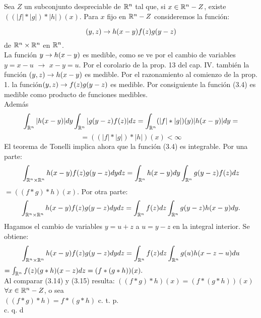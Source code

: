 Sea $Z$ un subconjunto despreciable de $\mathbb{R}^n$ tal que, si $x\in \mathbb{R}^n - Z$, existe $((|f| * |g|)*|h|)(x)$. Para $x$ fijo en $\mathbb{R}^n - Z$ consideremos la función:

\begin{equation}
(y,z) \rightarrow h(x-y)f(z)g(y-z)
\end{equation}
  de $\mathbb{R}^n \times \mathbb{R}^n$ en $\mathbb{R}^n$. \\
  La función $y \rightarrow h(x-y)$ es medible, como se ve por el cambio de variables $y=x-u$ $\to$ $x-y=u$. Por el corolario de la prop. 13 del cap. IV. también la función $(y,z) \rightarrow h(x-y)$ es medible. Por el razonamiento al comienzo de la prop. 1. la función$(y,z) \rightarrow f(z)g(y-z)$ es medible. Por consiguiente la función (3.4) es medible como producto de funciones medibles.\\
Además 
$$
\int_{\mathbb{R}^n}|h(x-y)|dy \int_{\mathbb{R}^n}|g(y-z)f(z)|dz=\int_{
\mathbb{R}^n}  (|f|*|g|)(y)|h(x-y)|dy=
$$
$$
=((|f|*|g|)*|h|)(x) < \infty
$$
El teorema de Tonelli implica ahora que la función (3.4) es integrable. Por una parte:
\begin{equation}
\int_{\mathbb{R}^n \times \mathbb{R}^n} h(x-y)f(z)g(y-z)dydz=\int_{\mathbb{R}^n} h(x-y)dy\int_{\mathbb{R}^n}g(y-z)f(z)dz	
\end{equation}
$=((f*g)*h)(x)$.
Por otra parte:
$$
\int_{\mathbb{R}^n \times \mathbb{R}^n} h(x-y)f(z)g(y-z)dydz=\int_{\mathbb{R}^n} f(z)dz\int_{\mathbb{R}^n}g(y-z)h(x-y)dy.	
$$
Hagamos el cambio de variables $y=u+z$ a $u=y-z$ en la integral interior. Se obtiene: 
\begin{equation}
\int_{\mathbb{R}^n \times \mathbb{R}^n} h(x-y)f(z)g(y-z)dydz=\int_{\mathbb{R}^n} f(z)dz \int_{\mathbb{R}^n}g(u)h(x-z-u)du
\end{equation}
$=\int_{\mathbb{R}^n}f(z)(g*h)(x-z)dz=(f*(g*h))(x).$\\
Al comparar (3.14) y (3.15) resulta:
$((f*g)*h)(x)=(f*(g*h))(x)$ $\forall x \in \mathbb{R}^n -Z$, o sea \\
$((f*g)*h)=f*(g*h)$ c. t. p.  \\
  \phantom{sssssssssssssssssssssssssssssssssss sasdasdasdasdadadssada} c. q. d \\ \\
  
